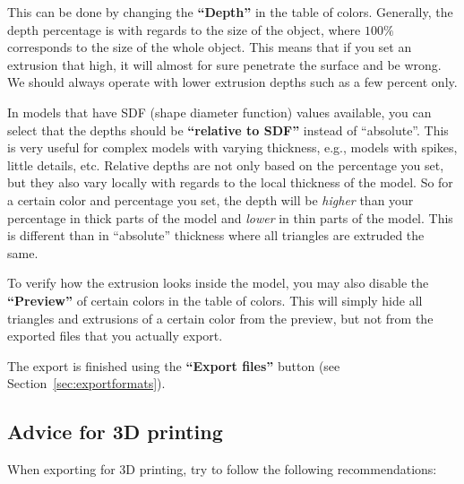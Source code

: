 This can be done by changing the \textbf{``Depth''} in the table of colors.
Generally, the depth percentage is with regards to the size of the object, where $100\%$ corresponds to the size of the whole object.
This means that if you set an extrusion that high, it will almost for sure penetrate the surface and be wrong.
We should always operate with lower extrusion depths such as a few percent only.

In models that have SDF (shape diameter function) values available, you can select that the depths should be \textbf{``relative to SDF''} instead of ``absolute''.
This is very useful for complex models with varying thickness, e.g., models with spikes, little details, etc.
Relative depths are not only based on the percentage you set, but they also vary locally with regards to the local thickness of the model.
So for a certain color and percentage you set, the depth will be \emph{higher} than your percentage in thick parts of the model and \emph{lower} in thin parts of the model.
This is different than in ``absolute'' thickness where all triangles are extruded the same.

To verify how the extrusion looks inside the model, you may also disable the \textbf{``Preview''} of certain colors in the table of colors.
This will simply hide all triangles and extrusions of a certain color from the preview, but not from the exported files that you actually export.

The export is finished using the \textbf{``Export files''} button (see Section~\ref{sec:exportformats}).

\subsection{Advice for 3D printing}
When exporting for 3D printing, try to follow the following recommendations:

